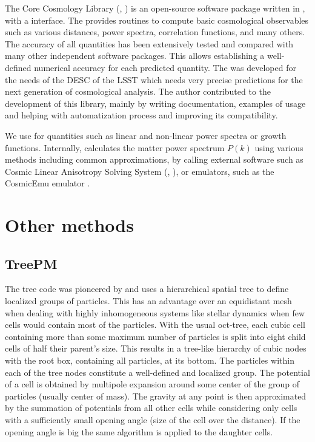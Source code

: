 The Core Cosmology Library (, \textcite{2019ApJS..242....2C}) is an open-source software package written in , with a  interface. The  provides routines to compute basic cosmological observables such as various distances, power spectra, correlation functions, and many others. The accuracy of all quantities has been extensively tested and compared with many other independent software packages. This allows establishing a well-defined numerical accuracy for each predicted quantity. The  was developed for the needs of the DESC of the LSST which needs very precise predictions for the next generation of cosmological analysis. The author contributed to the development of this library, mainly by writing documentation, examples of usage and helping with automatization process and improving its compatibility.

We use  for quantities such as linear and non-linear power spectra or growth functions. Internally,  calculates the matter power spectrum  $P(k)$ using various methods including common approximations, by calling external software such as Cosmic Linear Anisotropy Solving System (, \textcite{class}), or emulators, such as the CosmicEmu emulator \parencite{Heitmann:2015xma}.

\section{Other methods}
\subsection{TreePM}
The tree code was pioneered by \textcite{1986Natur.324..446B} and uses a hierarchical spatial tree to define localized groups of particles. This has an advantage over an equidistant mesh when dealing with highly inhomogeneous systems like stellar dynamics when few cells would contain most of the particles. With the usual oct-tree, each cubic cell containing more than some maximum number of particles is split into eight child cells of half their parent's size. This results in a tree-like hierarchy of cubic nodes with the root box, containing all particles, at its bottom. The particles within each of the tree nodes constitute a well-defined and localized group. The potential of a cell is obtained by multipole expansion around some center of the group of particles (usually center of mass). The gravity at any point is then approximated by the summation of potentials from all other cells while considering only cells with a sufficiently small opening angle (size of the cell over the distance). If the opening angle is big the same algorithm is applied to the daughter cells.

